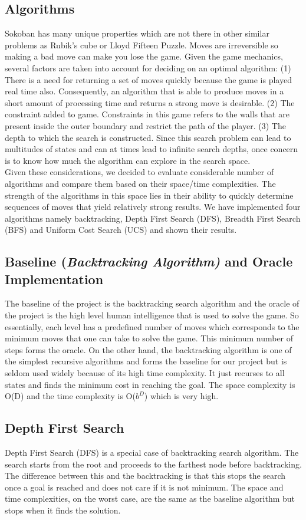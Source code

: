 \documentclass[10pt, final]{article}
\newcommand{\br}[1][.75]{\ \\[#1\baselineskip]}
\begin{document}
\begin{multicols}{2}
	\section{Algorithms}
	Sokoban has many unique properties which are not there in other similar problems as Rubik’s cube or Lloyd Fifteen Puzzle. Moves are irreversible so making a bad move can make you lose the game. Given the game mechanics, several factors are taken into account for deciding on an optimal algorithm:
	(1) There is a need for returning a set of moves quickly because the game is played real time also. Consequently, an algorithm that is able to produce moves in a short amount of processing time and returns a strong move is desirable.
	(2) The constraint added to game. Constraints in this game refers to the walls that are present inside the outer boundary and restrict the path of the player.
	(3) The depth to which the search is constructed. Since this search problem can lead to multitudes of states and can at times lead to infinite search depths, once concern is to know how much the algorithm can explore in the search space. \br
	Given these considerations, we decided to evaluate considerable number of algorithms and compare them based on their space/time complexities. The strength of the algorithms in this space lies in their ability to quickly determine sequences of moves that yield relatively strong results. We have implemented four algorithms namely backtracking, Depth First Search (DFS), Breadth First Search (BFS) and Uniform Cost Search (UCS) and shown their results.
	\subsection{Baseline (\textit{Backtracking Algorithm)} and Oracle Implementation}
	The baseline of the project is the backtracking search algorithm and the oracle of the project is the high level human intelligence that is used to solve the game. So essentially, each level has a predefined number of moves which corresponds to the minimum moves that one can take to solve the game. This minimum number of steps forms the oracle. On the other hand, the backtracking algorithm is one of the simplest recursive algorithms and forms the baseline for our project but is seldom used widely because of its high time complexity. It just recurses to all states and finds the minimum cost in reaching the goal. The space complexity is O(D) and the time complexity is O($b^D$) which is very high. 
	\subsection{Depth First Search}
	Depth First Search (DFS) is a special case of backtracking search algorithm. The search starts from the root and proceeds to the farthest node before backtracking. The difference between this and the backtracking is that this stops the search once a goal is reached and does not care if it is not minimum. The space and time complexities, on the worst case, are the same as the baseline algorithm but stops when it finds the solution. 

\end{multicols}
\end{document}
